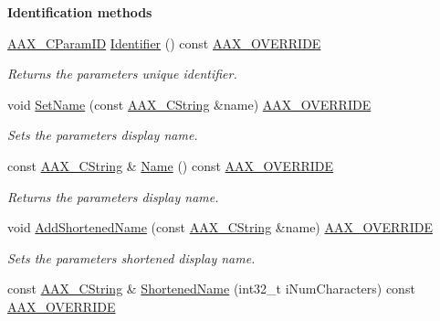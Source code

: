 \begin{Indent}\textbf{ Identification methods}\par
\begin{DoxyCompactItemize}
\item 
\mbox{\hyperlink{a00392_a1440c756fe5cb158b78193b2fc1780d1}{A\+A\+X\+\_\+\+C\+Param\+ID}} \mbox{\hyperlink{a01537_aedf516885af595cae5d07dee050d9792}{Identifier}} () const \mbox{\hyperlink{a00392_ac2f24a5172689ae684344abdcce55463}{A\+A\+X\+\_\+\+O\+V\+E\+R\+R\+I\+DE}}
\begin{DoxyCompactList}\small\item\em Returns the parameter\textquotesingle{}s unique identifier. \end{DoxyCompactList}\item 
void \mbox{\hyperlink{a01537_a95ccc6ef9aff70e029c55caf2c2bd432}{Set\+Name}} (const \mbox{\hyperlink{a01573}{A\+A\+X\+\_\+\+C\+String}} \&name) \mbox{\hyperlink{a00392_ac2f24a5172689ae684344abdcce55463}{A\+A\+X\+\_\+\+O\+V\+E\+R\+R\+I\+DE}}
\begin{DoxyCompactList}\small\item\em Sets the parameter\textquotesingle{}s display name. \end{DoxyCompactList}\item 
const \mbox{\hyperlink{a01573}{A\+A\+X\+\_\+\+C\+String}} \& \mbox{\hyperlink{a01537_a0ca723751549cff4168198f8480b28e9}{Name}} () const \mbox{\hyperlink{a00392_ac2f24a5172689ae684344abdcce55463}{A\+A\+X\+\_\+\+O\+V\+E\+R\+R\+I\+DE}}
\begin{DoxyCompactList}\small\item\em Returns the parameter\textquotesingle{}s display name. \end{DoxyCompactList}\item 
void \mbox{\hyperlink{a01537_aa4f22a15a2e73048b602e7f81db37cb4}{Add\+Shortened\+Name}} (const \mbox{\hyperlink{a01573}{A\+A\+X\+\_\+\+C\+String}} \&name) \mbox{\hyperlink{a00392_ac2f24a5172689ae684344abdcce55463}{A\+A\+X\+\_\+\+O\+V\+E\+R\+R\+I\+DE}}
\begin{DoxyCompactList}\small\item\em Sets the parameter\textquotesingle{}s shortened display name. \end{DoxyCompactList}\item 
const \mbox{\hyperlink{a01573}{A\+A\+X\+\_\+\+C\+String}} \& \mbox{\hyperlink{a01537_a3a804fb1ba33f9b748294bc868915813}{Shortened\+Name}} (int32\+\_\+t i\+Num\+Characters) const \mbox{\hyperlink{a00392_ac2f24a5172689ae684344abdcce55463}{A\+A\+X\+\_\+\+O\+V\+E\+R\+R\+I\+DE}}

\end{DoxyCompactItemize}
\end{Indent}
